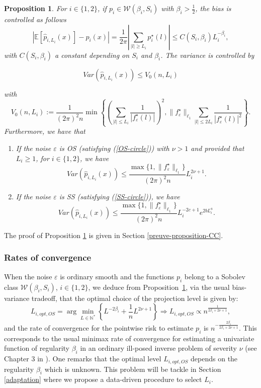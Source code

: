 \documentclass[11pt,a4paper,openany]{article}
\newtheorem{proposition}[thm]{Proposition}
\def\N{\mathbb{N}}
\def\E{\mathbb{E}}
\begin{document}
\begin{proposition} \label{var-hat-p} For $i\in \{1,2 \}$, if $p_i \in \mathcal{W}(\beta_i, S_i)$ with $\beta_i> \frac 1 2$,  the bias is controlled as follows
$$| \E[\widehat p_{i,L_i}(x)] -p_i(x)|  = \frac{1}{2 \pi } \left  | \sum_{|l| \geq L_i} p_i^\star(l) \right |  \leq C(S_i,\beta_i) L_i^{-\beta_i},$$
with $C(S_i, \beta_i)$ a constant depending on $S_i$ and $\beta_i$. The variance  is controlled by

$$
Var(\widehat p_{i,L_i}(x))  \leq V_0(n,L_i)$$

with 
$$
 V_0(n,L_i) := \frac{1}{(2\pi)^2n}\min \left \{ \left  ( \sum_{ | l | \leq L_i}  \frac{1}{ |f^\star_{\varepsilon}(l)| }\right )^2,    \| f^\star_{\varepsilon} \|_{\ell_1}  \sum_{|l | \leq 2L_i }   \frac{1}{ |f^\star_{\varepsilon}(l)|^2}    \right\}.
$$
Furthermore, we have that
\begin{enumerate}
\item If the noise $\varepsilon$ is OS (satisfying (\ref{OS-circle})) with $\nu>1$ and provided that $L_i \geq 1$, for $ i \in \{1, 2 \}$, we have 
$$
Var(\widehat p_{i,L_i}(x))  \leq \frac{\max \{1, \|  f^\star_{\varepsilon}\|_{\ell_1} \}}{(2\pi)^2n} L_i^{2\nu +1 }. 
$$

\item If the noise $\varepsilon$ is SS  (satisfying (\ref{SS-circle})), we have 
$$
Var(\widehat p_{i,L_i}(x)) \leq \frac{\max\{1, \|  f^\star_{\varepsilon}\|_{\ell_1}\}}{(2\pi)^2n} L_i^{-2 c+1 } e^{2 b L_i^a}.
$$
\end{enumerate}
\end{proposition}
The proof of Proposition \ref{var-hat-p} is given in Section \ref{preuve-proposition-CC}.


\subsubsection{Rates of convergence} \label{circular-rates}

When the noise $\varepsilon$ is ordinary smooth and the functions $p_i$ belong to a Sobolev class $\mathcal{W}(\beta_i, S_i)$, $i \in \{1, 2\}$, we deduce from Proposition~\ref{var-hat-p}, via the usual bias-variance tradeoff, that the optimal choice of the projection level is given by:
$$L_{i,{opt,OS}} = \arg \min_{L \in \N^*} \left \{ L^{-2\beta_i} + \frac{1}{n} L^{2\nu +1}  \right \} \Rightarrow
 L_{i,{opt,OS}}  \varpropto {n}^{\frac{1}{2\beta_i + 2 \nu +1 }},
 $$
and the rate of convergence for the pointwise risk to estimate $p_i$ is  $n^{-\frac{2\beta_i}{2\beta_i + 2\nu +1}}$. This corresponds to
 the usual minimax rate of convergence for estimating a univariate function of regularity $\beta_i$ in an ordinary ill-posed inverse problem of severity $\nu$ (see Chapter 3 in \cite{Meister}). One remarks that the optimal level $ L_{i,{opt, OS}}$ depends on the regularity $\beta_i$ which is unknown. This problem will be tackle in Section  \ref{adaptation} where we propose a data-driven procedure to select  $L_i$. 
\medskip
\end{document}
